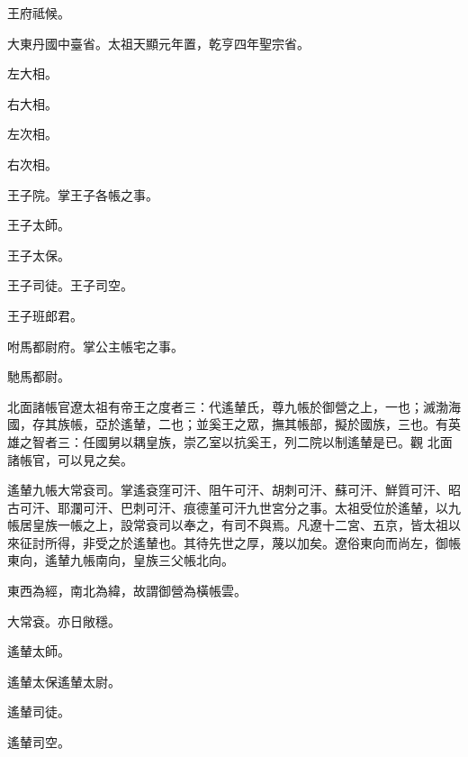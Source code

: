 \begin{pinyinscope}
 王府祗候。



 大東丹國中臺省。太祖天顯元年置，乾亨四年聖宗省。



 左大相。



 右大相。



 左次相。



 右次相。



 王子院。掌王子各帳之事。



 王子太師。



 王子太保。



 王子司徒。王子司空。



 王子班郎君。



 咐馬都尉府。掌公主帳宅之事。



 馳馬都尉。



 北面諸帳官遼太祖有帝王之度者三：代遙輦氏，尊九帳於御營之上，一也；滅渤海國，存其族帳，亞於遙輦，二也；並奚王之眾，撫其帳部，擬於國族，三也。有英雄之智者三：任國舅以耦皇族，崇乙室以抗奚王，列二院以制遙輦是已。觀
 北面諸帳官，可以見之矣。



 遙輦九帳大常袞司。掌遙袞窪可汗、阻午可汗、胡刺可汗、蘇可汗、鮮質可汗、昭古可汗、耶瀾可汗、巴刺可汗、痕德堇可汗九世宮分之事。太祖受位於遙輦，以九帳居皇族一帳之上，設常袞司以奉之，有司不與焉。凡遼十二宮、五京，皆太祖以來征討所得，非受之於遙輦也。其待先世之厚，蔑以加矣。遼俗東向而尚左，御帳東向，遙輦九帳南向，皇族三父帳北向。



 東西為經，南北為緯，故謂御營為橫帳雲。



 大常袞。亦日敞穩。



 遙輦太師。



 遙輦太保遙輦太尉。



 遙輦司徒。



 遙輦司空。




\end{pinyinscope}
